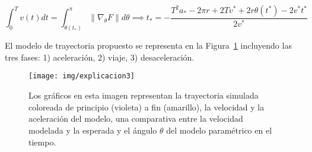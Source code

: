 \documentclass[]{article}
\begin{document}
	\begin{equation}
		\int_{0}^{T}{v(t) dt} = \int_{\theta(t_*)}^{\pi}{\lVert{\nabla_\theta F}\rVert} d\theta \implies
		t_* = - \dfrac{
			T^{2} {a_*} - 2 \pi r + 2 T {v^*} + 2 r {\theta(t^*)} - 2 v^* {t^*}
		}{
			2 v^*
		}
	\label{eq:instante_desaceleracion}		
	\end{equation}

	El modelo de trayectoria propuesto se representa en la Figura~\ref{fig:explicacion3} incluyendo las tres fases: 1) aceleración, 2) viaje, 3) desaceleración.
	
	\begin{figure}[htb]
		\centering
		\texttt{[image: img/explicacion3]}
		\caption{Los gráficos en esta imagen representan la trayectoria simulada coloreada de principio (violeta) a fin (amarillo), la velocidad y la aceleración del modelo, una comparativa entre la velocidad modelada y la esperada y el ángulo $\theta$ del modelo paramétrico en el tiempo.}
		\label{fig:explicacion3}
	\end{figure} 
\end{document}
